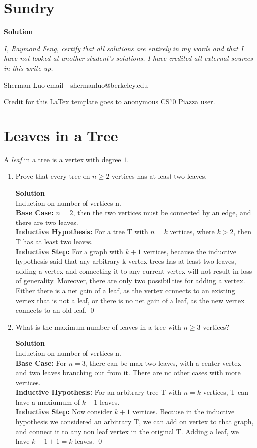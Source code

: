 \documentclass[11pt]{article}
\newcommand*{\Question}[1]{\section{#1}}
\newenvironment{Parts}{\begin{enumerate}[label=(\alph*)]}{\end{enumerate}}
\newcommand*{\Part}{\item}
\begin{document}
\Question{Sundry} 
\vspace{5pt}
\begin{mdframed} \textbf{Solution} 
\item \textit {I, Raymond Feng, certify that all solutions are entirely in my words and that I have not looked at another student's solutions. I have credited all external sources in this write up.}
\item Sherman Luo email - shermanluo@berkeley.edu
\item Credit for this LaTex template goes to anonymous CS70 Piazza user.
\end{mdframed}
\vfill\pagebreak[3]
\pagebreak

\Question{Leaves in a Tree}

A {\em leaf} in a tree is a vertex with degree $1$.
\begin{Parts}
  \Part 
  Prove that every tree on $n \ge 2$ vertices has at least two leaves.
  
\begin{mdframed} \textbf{Solution} \\
Induction on number of vertices n. \\
\textbf{Base Case: }$n=2$, then the two vertices must be connected by an edge, and there are two leaves. \\
\textbf{Inductive Hypothesis: }For a tree T with $n=k$ vertices, where $k>2$, then T has at least two leaves. \\
\textbf{Inductive Step: }For a graph with $k+1$ vertices, because the inductive hypothesis said that any arbitrary k vertex trees has at least two leaves, adding a vertex and connecting it to any current vertex will not result in loss of generality. Moreover, there are only two possibilities for adding a vertex. Either there is a net gain of a leaf, as the vertex connects to an existing vertex that is not a leaf, or there is no net gain of a leaf, as the new vertex connects to an old leaf. \qed
\end{mdframed}
  

  \Part What is the maximum number of leaves in a tree with $n \ge 3$ vertices?

\begin{mdframed} \textbf{Solution} \\
Induction on number of vertices n. \\
\textbf{Base Case: }For $n=3$, there can be max two leaves, with a center vertex and two leaves branching out from it. There are no other cases with more vertices.\\
\textbf{Inductive Hypothesis: }For an arbitrary tree T with $n=k$ vertices, T can have a maxiumum of $k-1$ leaves.\\
\textbf{Inductive Step: }Now consider $k+1$ vertices. Because in the inductive hypothesis we considered an arbitrary T, we can add on vertex to that graph, and connect it to any non leaf vertex in the original T. Adding a leaf, we have $k-1+1=k$ leaves. \qed
\end{mdframed}


\end{Parts}
\end{document}
